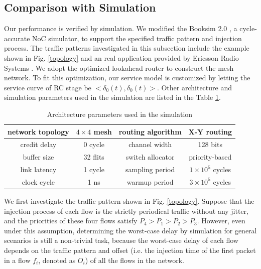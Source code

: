 \documentclass[preprint]{elsarticle}
\begin{document}
\subsection{Comparison with Simulation}\label{sim}
Our performance is verified by simulation. We modified the Booksim 2.0 \cite{6557149}, a cycle-accurate NoC simulator, to support the specified traffic pattern and injection process. The traffic patterns investigated in this subsection include the example shown in Fig. \ref{topology} and an real application provided by Ericsson Radio Systems \cite{LuJa08}\cite{Jafari1922089}. We adopt the optimized lookahead router \cite{jerger2009chip} to construct the mesh network. To fit this optimization, our service model is customized by letting the service curve of RC stage be $<\delta_0(t),\delta_0(t)>$. Other architecture and simulation parameters used in the simulation are listed in the Table \ref{arcpara}.
\begin{table}[htbp]
\centering
\caption{\label{arcpara}Architecture parameters used in the simulation}
\begin{tabular}{|c|c||c|c|}
\hline
network topology    & $4\times 4$ mesh  &   routing algorithm & X-Y routing\\
\hline
credit delay &  0 cycle &   channel width   & 128 bits\\
\hline
buffer size &   32 flits  &   switch allocator    &   priority-based\\
\hline
link latency    &   1 cycle    & sampling period &   $1\times 10^5$ cycles\\
\hline
clock cycle &   1 ns    &   warmup period   &   $3\times 10^5$ cycles\\
\hline
\end{tabular}
\end{table}

We first investigate the traffic pattern shown in Fig. \ref{topology}. Suppose that the injection process of each flow is the strictly periodical traffic without any jitter, and the priorities of these four flows satisfy $P_4>P_1>P_2>P_3$. However, even under this assumption, determining the worst-case delay by simulation for general scenarios is still a non-trivial task, because the worst-case delay of each flow depends on the traffic pattern and offset (i.e. the injection time of the first packet in a flow $f_i$, denoted as $O_i$) of all the flows in the network.
\end{document}
